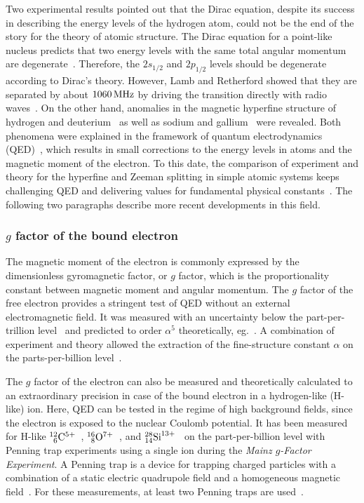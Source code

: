 Two experimental results pointed out that the Dirac equation, despite its success in describing the energy levels of the hydrogen atom, could not be the end of the story for the theory of atomic structure. 
The Dirac equation for a point-like nucleus predicts that two energy levels with the same total angular momentum are degenerate~\cite{greiner2000}. Therefore, the $2s_{1/2}$ and $2p_{1/2}$ levels should be degenerate according to Dirac's theory. However, Lamb and Retherford showed that they are separated by about $1060\,\rm{MHz}$ by driving the transition directly with radio waves~\cite{lamb1947}. On the other hand, anomalies in the magnetic hyperfine structure of hydrogen and deuterium~\cite{nafe1947} as well as sodium and gallium~\cite{kusch1947,kusch1948} were revealed. Both phenomena were explained in the framework of quantum electrodynamics (QED)~\cite{schwinger1948}, which results in small corrections to the energy levels in atoms and the magnetic moment of the electron. To this date, the comparison of experiment and theory for the hyperfine and Zeeman splitting in simple atomic systems keeps challenging QED and delivering values for fundamental physical constants~\cite{haensch1979}. The following two paragraphs describe more recent developments in this field.
\subsubsection*{$g$ factor of the bound electron}
The magnetic moment of the electron is commonly expressed by the dimensionless gyromagnetic factor, or $g$ factor, which is the proportionality constant between magnetic moment and angular momentum. The $g$ factor of the free electron provides a stringent test of QED without an external electromagnetic field. It was measured with an uncertainty below the part-per-trillion level~\cite{odom2006,hanneke2008} and predicted to order $\alpha^5$ theoretically, eg.~\cite{kinoshita2006,aoyama2007,aoyama2015,aoyama2017}. A combination of experiment and theory allowed the extraction of the fine-structure constant $\alpha$ on the parts-per-billion level~\cite{gabrielse2006,gabrielse2007}.

The $g$ factor of the electron can also be measured and theoretically calculated to an extraordinary precision in case of the bound electron in a hydrogen-like (H-like) ion. Here, QED can be tested in the regime of high background fields, since the electron is exposed to the nuclear Coulomb potential. It has been measured for H-like $^{12}_{\phantom{0}6}\rm{C}^{5+}$~\cite{Haffner2000,Sturm2014}, $^{16}_{\phantom{0}8}\rm{O}^{7+}$~\cite{Verdu2004}, and $^{28}_{14}\rm{Si}^{13+}$~\cite{Sturm2011} on the part-per-billion level with Penning trap experiments using a single ion during the \textit{Mainz $g$-Factor Experiment}. A Penning trap is a device for trapping charged particles with a combination of a static electric quadrupole field and a homogeneous magnetic field~\cite{geoniumtheory}. For these measurements, at least two Penning traps are used~\cite{annphysgfactor}.

